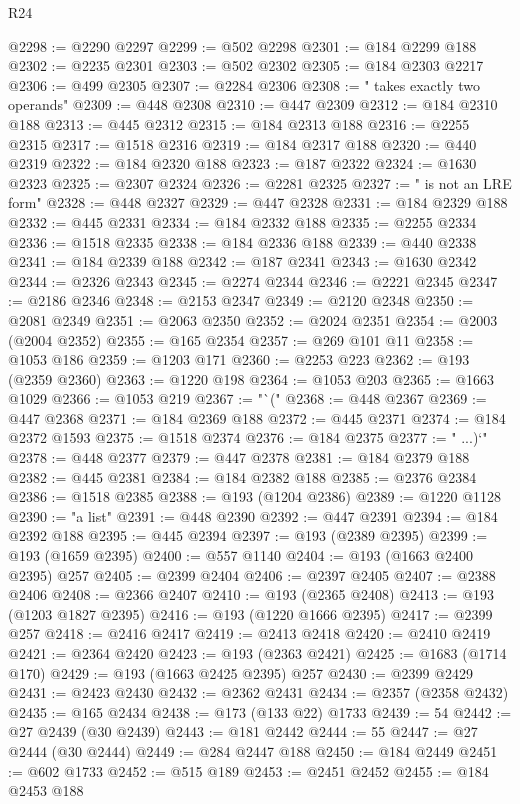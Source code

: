 \begin{lexlean}{R24}
\begin{coremodule}
@2298 := @2290 @2297
@2299 := @502 @2298
@2301 := @184 @2299 @188
@2302 := @2235 @2301
@2303 := @502 @2302
@2305 := @184 @2303 @2217
@2306 := @499 @2305
@2307 := @2284 @2306
@2308 := " takes exactly two operands"
@2309 := @448 @2308
@2310 := @447 @2309
@2312 := @184 @2310 @188
@2313 := @445 @2312
@2315 := @184 @2313 @188
@2316 := @2255 @2315
@2317 := @1518 @2316
@2319 := @184 @2317 @188
@2320 := @440 @2319
@2322 := @184 @2320 @188
@2323 := @187 @2322
@2324 := @1630 @2323
@2325 := @2307 @2324
@2326 := @2281 @2325
@2327 := " is not an LRE form"
@2328 := @448 @2327
@2329 := @447 @2328
@2331 := @184 @2329 @188
@2332 := @445 @2331
@2334 := @184 @2332 @188
@2335 := @2255 @2334
@2336 := @1518 @2335
@2338 := @184 @2336 @188
@2339 := @440 @2338
@2341 := @184 @2339 @188
@2342 := @187 @2341
@2343 := @1630 @2342
@2344 := @2326 @2343
@2345 := @2274 @2344
@2346 := @2221 @2345
@2347 := @2186 @2346
@2348 := @2153 @2347
@2349 := @2120 @2348
@2350 := @2081 @2349
@2351 := @2063 @2350
@2352 := @2024 @2351
@2354 := @2003 (@2004 @2352)
@2355 := @165 @2354
@2357 := @269 @101 @11
@2358 := @1053 @186
@2359 := @1203 @171
@2360 := @2253 @223
@2362 := @193 (@2359 @2360)
@2363 := @1220 @198
@2364 := @1053 @203
@2365 := @1663 @1029
@2366 := @1053 @219
@2367 := "`("
@2368 := @448 @2367
@2369 := @447 @2368
@2371 := @184 @2369 @188
@2372 := @445 @2371
@2374 := @184 @2372 @1593
@2375 := @1518 @2374
@2376 := @184 @2375
@2377 := " ...)`"
@2378 := @448 @2377
@2379 := @447 @2378
@2381 := @184 @2379 @188
@2382 := @445 @2381
@2384 := @184 @2382 @188
@2385 := @2376 @2384
@2386 := @1518 @2385
@2388 := @193 (@1204 @2386)
@2389 := @1220 @1128
@2390 := "a list"
@2391 := @448 @2390
@2392 := @447 @2391
@2394 := @184 @2392 @188
@2395 := @445 @2394
@2397 := @193 (@2389 @2395)
@2399 := @193 (@1659 @2395)
@2400 := @557 @1140
@2404 := @193 (@1663 @2400 @2395) @257
@2405 := @2399 @2404
@2406 := @2397 @2405
@2407 := @2388 @2406
@2408 := @2366 @2407
@2410 := @193 (@2365 @2408)
@2413 := @193 (@1203 @1827 @2395)
@2416 := @193 (@1220 @1666 @2395)
@2417 := @2399 @257
@2418 := @2416 @2417
@2419 := @2413 @2418
@2420 := @2410 @2419
@2421 := @2364 @2420
@2423 := @193 (@2363 @2421)
@2425 := @1683 (@1714 @170)
@2429 := @193 (@1663 @2425 @2395) @257
@2430 := @2399 @2429
@2431 := @2423 @2430
@2432 := @2362 @2431
@2434 := @2357 (@2358 @2432)
@2435 := @165 @2434
@2438 := @173 (@133 @22) @1733
@2439 := 54
@2442 := @27 @2439 (@30 @2439)
@2443 := @181 @2442
@2444 := 55
@2447 := @27 @2444 (@30 @2444)
@2449 := @284 @2447 @188
@2450 := @184 @2449
@2451 := @602 @1733
@2452 := @515 @189
@2453 := @2451 @2452
@2455 := @184 @2453 @188

\end{coremodule}
\end{lexlean}
